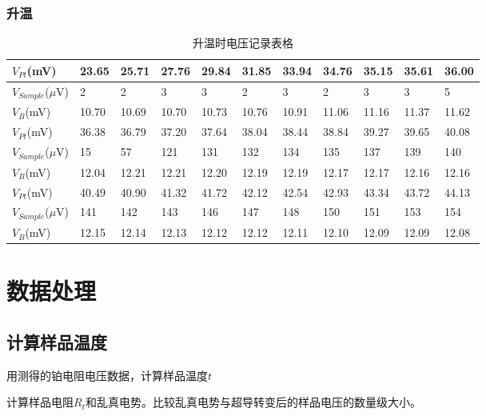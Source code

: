 \documentclass[UTF8]{ctexart}
\begin{document}
    \subsubsection{升温}

    \begin{table}[H]
        \centering
        \begin{tabular}{|l|l|l|l|l|l|l|l|l|l|l|}
        \hline
            $V_{Pt}$(mV) & 23.65 & 25.71 & 27.76 & 29.84 & 31.85 & 33.94 & 34.76 & 35.15 & 35.61 & 36.00 \\ \hline
            $V_{Sample}$($\mu$V) & 2 & 2 & 3 & 3 & 2 & 3 & 2 & 3 & 3 & 5 \\ \hline
            $V_B$(mV) & 10.70 & 10.69 & 10.70 & 10.73 & 10.76 & 10.91 & 11.06 & 11.16 & 11.37 & 11.62 \\ \hline
            \hline
            $V_{Pt}$(mV) & 36.38 & 36.79 & 37.20 & 37.64 & 38.04 & 38.44 & 38.84 & 39.27 & 39.65 & 40.08 \\ \hline
            $V_{Sample}$($\mu$V) & 15 & 57 & 121 & 131 & 132 & 134 & 135 & 137 & 139 & 140 \\ \hline
            $V_B$(mV) & 12.04 & 12.21 & 12.21 & 12.20 & 12.19 & 12.19 & 12.17 & 12.17 & 12.16 & 12.16 \\ \hline
            \hline
            $V_{Pt}$(mV) & 40.49 & 40.90 & 41.32 & 41.72 & 42.12 & 42.54 & 42.93 & 43.34 & 43.72 & 44.13 \\ \hline
            $V_{Sample}$($\mu$V) & 141 & 142 & 143 & 146 & 147 & 148 & 150 & 151 & 153 & 154 \\ \hline
            $V_B$(mV) & 12.15 & 12.14 & 12.13 & 12.12 & 12.12 & 12.11 & 12.10 & 12.09 & 12.09 & 12.08 \\ \hline
        \end{tabular}
        \caption{升温时电压记录表格} %
        \label{升温原数据表格} %
    \end{table}

\section{数据处理}

    \subsection{计算样品温度}

    用测得的铂电阻电压数据，计算样品温度$t$

    计算样品电阻$R_t$和乱真电势。比较乱真电势与超导转变后的样品电压的数量级大小。
\end{document}
